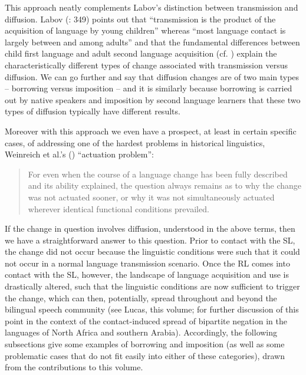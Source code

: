 \documentclass[output=paper]{langsci/langscibook}
\begin{document}
This approach neatly complements Labov's distinction between {transmission} and {diffusion}. Labov (\citeyear{Labov2007}: 349) points out that ``{transmission} is the product of the acquisition of language by young children'' whereas ``most language contact is largely between and among adults'' and that the fundamental differences between child first language and adult second language acquisition (cf. \citealt{BleyVroman1989,BleyVroman2009,Meisel2011}) explain the characteristically different types of change associated with {transmission} versus {diffusion}. We can go further and say that {diffusion} changes are of two main types -- borrowing versus {imposition} -- and it is similarly because borrowing is carried out by native speakers and {imposition} by second language learners that these two types of {diffusion} typically have different results.

Moreover with this approach we even have a prospect, at least in certain specific cases, of addressing one of the hardest problems in historical linguistics, Weinreich et al.'s  (\citeyear{WeinreichLabovHerzog1968}) ``{actuation} problem'':

\begin{quote}
For even when the course of a  {language change} has been fully described and its ability explained, the question always remains as to why the change was not {actuated} sooner, or why it was not simultaneously {actuated} wherever identical functional conditions prevailed. \citep[112]{WeinreichLabovHerzog1968}
\end{quote}

\noindent If the change in question involves {diffusion}, understood in the above terms, then we have a straightforward answer to this question. Prior to contact with the {SL}, the change did not occur because the linguistic conditions were such that it could not occur in a normal language {transmission} scenario. Once the {RL} comes into contact with the {SL}, however, the landscape of language acquisition and use is drastically altered, such that the linguistic conditions are now sufficient to trigger the change, which can then, potentially, spread throughout and beyond the bilingual {speech community} (see Lucas, this volume; \citealt{LucasLash2010} for further discussion of this point in the context of the contact-induced spread of bipartite {negation} in the languages of North Africa and southern Arabia). Accordingly, the following subsections give some examples of borrowing and {imposition} (as well as some problematic cases that do not fit easily into either of these categories), drawn from the contributions to this volume.
\end{document}

